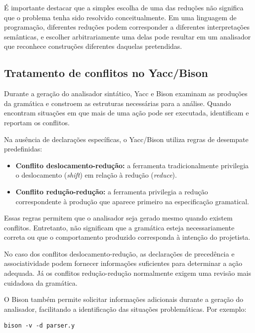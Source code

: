 \documentclass[
  brazilian,
  letterpaper,
]{book}
\providecommand{\tightlist}{%
  \setlength{\itemsep}{0pt}\setlength{\parskip}{0pt}}
\theoremstyle{plain}
\theoremstyle{definition}
\theoremstyle{remark}
\begin{document}
É importante destacar que a simples escolha de uma das reduções não
significa que o problema tenha sido resolvido conceitualmente. Em uma
linguagem de programação, diferentes reduções podem corresponder a
diferentes interpretações semânticas, e escolher arbitrariamente uma
delas pode resultar em um analisador que reconhece construções
diferentes daquelas pretendidas.

\subsection{Tratamento de conflitos no
Yacc/Bison}\label{tratamento-de-conflitos-no-yaccbison}

Durante a geração do analisador sintático, Yacc e Bison examinam as
produções da gramática e constroem as estruturas necessárias para a
análise. Quando encontram situações em que mais de uma ação pode ser
executada, identificam e reportam os conflitos.

Na ausência de declarações específicas, o Yacc/Bison utiliza regras de
desempate predefinidas:

\begin{itemize}
\tightlist
\item
  \textbf{Conflito deslocamento-redução:} a ferramenta tradicionalmente
  privilegia o deslocamento (\emph{shift}) em relação à redução
  (\emph{reduce}).
\item
  \textbf{Conflito redução-redução:} a ferramenta privilegia a redução
  correspondente à produção que aparece primeiro na especificação
  gramatical.
\end{itemize}

Essas regras permitem que o analisador seja gerado mesmo quando existem
conflitos. Entretanto, não significam que a gramática esteja
necessariamente correta ou que o comportamento produzido corresponda à
intenção do projetista.

No caso dos conflitos deslocamento-redução, as declarações de
precedência e associatividade podem fornecer informações suficientes
para determinar a ação adequada. Já os conflitos redução-redução
normalmente exigem uma revisão mais cuidadosa da gramática.

O Bison também permite solicitar informações adicionais durante a
geração do analisador, facilitando a identificação das situações
problemáticas. Por exemplo:

\begin{verbatim}
bison -v -d parser.y
\end{verbatim}
\end{document}
